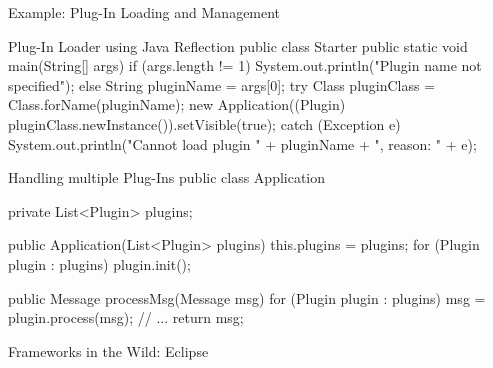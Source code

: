 \begin{frame}[fragile]{Example: Plug-In Loading and Management}
	\tiny\begin{mycolumns}[columns=2,widths={50,50}]
\begin{codetight}{Plug-In Loader using Java Reflection}
public class Starter {
	public static void main(String[] args) {
		if (args.length != 1)
			System.out.println("Plugin name not specified");
		else {
			String pluginName = args[0];
			try {
				Class pluginClass = Class.forName(pluginName);
				new Application((Plugin) pluginClass.newInstance()).setVisible(true);
			} catch (Exception e) {
				System.out.println("Cannot load plugin " + pluginName + ", reason: " + e);
			}
		}
	}
}
\end{codetight}
		\mynextcolumn
\begin{codetight}{Handling multiple Plug-Ins}
public class Application {
	private List<Plugin> plugins;

	public Application(List<Plugin> plugins) {
		this.plugins = plugins;
		for (Plugin plugin : plugins) {
			plugin.init();
		}
	}

	public Message processMsg(Message msg) {
		for (Plugin plugin : plugins) {
			msg = plugin.process(msg);
			// ...
		}
		return msg;
	}
}
\end{codetight}
	\end{mycolumns}
\end{frame}

\begin{frame}{Frameworks in the Wild: Eclipse}
	\begin{mycolumns}[widths={70,30},animation=none]
	\mynextcolumn
	\end{mycolumns}
\end{frame}

